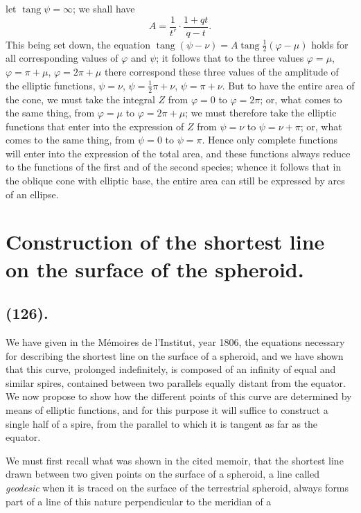 \documentclass{article}
\begin{document}
let $\operatorname{tang}\psi=\infty$; we shall have
\[ A=\frac{1}{t'}\cdot\frac{1+qt}{q-t}. \]
This being set down, the equation $\operatorname{tang}(\psi-\nu)=A\operatorname{tang}\frac{1}{2}(\varphi-\mu)$ holds for all corresponding values of $\varphi$ and $\psi$; it follows that to the three values $\varphi=\mu$, $\varphi=\pi+\mu$, $\varphi=2\pi+\mu$ there correspond these three values of the amplitude of the elliptic functions, $\psi=\nu$, $\psi=\frac{1}{2}\pi+\nu$, $\psi=\pi+\nu$. But to have the entire area of the cone, we must take the integral $Z$ from $\varphi=0$ to $\varphi=2\pi$; or, what comes to the same thing, from $\varphi=\mu$ to $\varphi=2\pi+\mu$; we must therefore take the elliptic functions that enter into the expression of $Z$ from $\psi=\nu$ to $\psi=\nu+\pi$; or, what comes to the same thing, from $\psi=0$ to $\psi=\pi$. Hence only complete functions will enter into the expression of the total area, and these functions always reduce to the functions of the first and of the second species; whence it follows that in the oblique cone with elliptic base, the entire area can still be expressed by arcs of an ellipse.

\section*{Construction of the shortest line on the surface of the spheroid.}

\subsection*{(126).}

We have given in the Mémoires de l'Institut, year 1806, the equations necessary for describing the shortest line on the surface of a spheroid, and we have shown that this curve, prolonged indefinitely, is composed of an infinity of equal and similar spires, contained between two parallels equally distant from the equator. We now propose to show how the different points of this curve are determined by means of elliptic functions, and for this purpose it will suffice to construct a single half of a spire, from the parallel to which it is tangent as far as the equator.

We must first recall what was shown in the cited memoir, that the shortest line drawn between two given points on the surface of a spheroid, a line called \emph{geodesic} when it is traced on the surface of the terrestrial spheroid, always forms part of a line of this nature perpendicular to the meridian of a
\end{document}
